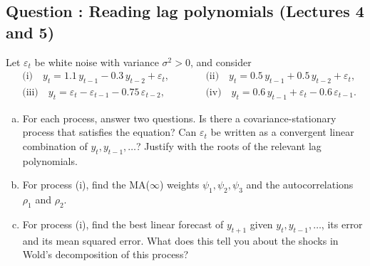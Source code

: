 \documentclass[11pt]{article}
\newcounter{question}
\newcommand{\question}[1]{
	\stepcounter{question}
	\subsection*{Question \thequestion: #1}
}
\begin{document}
\question{Reading lag polynomials (Lectures 4 and 5)}

Let $\varepsilon_t$ be white noise with variance $\sigma^2>0$, and consider
\[
\begin{aligned}
&\text{(i)}\quad y_t=1.1\,y_{t-1}-0.3\,y_{t-2}+\varepsilon_t, &\qquad &\text{(ii)}\quad y_t=0.5\,y_{t-1}+0.5\,y_{t-2}+\varepsilon_t,\\
&\text{(iii)}\quad y_t=\varepsilon_t-\varepsilon_{t-1}-0.75\,\varepsilon_{t-2}, &\qquad &\text{(iv)}\quad y_t=0.6\,y_{t-1}+\varepsilon_t-0.6\,\varepsilon_{t-1}.
\end{aligned}
\]
\begin{enumerate}[a)]
	\item For each process, answer two questions. Is there a covariance-stationary process that satisfies the equation? Can $\varepsilon_t$ be written as a convergent linear combination of $y_t,y_{t-1},\dots$? Justify with the roots of the relevant lag polynomials.
	\item For process (i), find the MA($\infty$) weights $\psi_1,\psi_2,\psi_3$ and the autocorrelations $\rho_1$ and $\rho_2$.
	\item For process (i), find the best linear forecast of $y_{t+1}$ given $y_t,y_{t-1},\dots$, its error and its mean squared error. What does this tell you about the shocks in Wold's decomposition of this process?
\end{enumerate}
\end{document}
